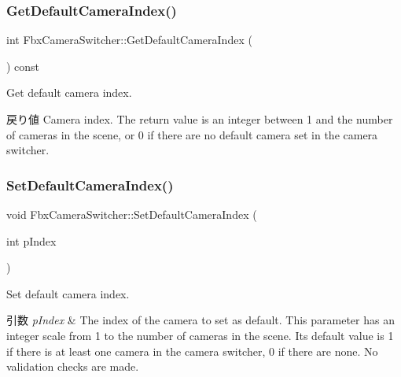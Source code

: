 \mbox{\label{class_fbx_camera_switcher_a283e9644112eee776c029b59ea02f857}} 
\subsubsection{\texorpdfstring{Get\+Default\+Camera\+Index()}{GetDefaultCameraIndex()}}
{\footnotesize\ttfamily int Fbx\+Camera\+Switcher\+::\+Get\+Default\+Camera\+Index (\begin{DoxyParamCaption}{ }\end{DoxyParamCaption}) const}

Get default camera index. \begin{DoxyReturn}{戻り値}
Camera index. The return value is an integer between 1 and the number of cameras in the scene, or 0 if there are no default camera set in the camera switcher. 
\end{DoxyReturn}
\mbox{\label{class_fbx_camera_switcher_a23c4972acf381134aee70436e7d18549}} 
\subsubsection{\texorpdfstring{Set\+Default\+Camera\+Index()}{SetDefaultCameraIndex()}}
{\footnotesize\ttfamily void Fbx\+Camera\+Switcher\+::\+Set\+Default\+Camera\+Index (\begin{DoxyParamCaption}\item[{int}]{p\+Index }\end{DoxyParamCaption})}

Set default camera index. 
\begin{DoxyParams}{引数}
{\em p\+Index} & The index of the camera to set as default. This parameter has an integer scale from 1 to the number of cameras in the scene. Its default value is 1 if there is at least one camera in the camera switcher, 0 if there are none. No validation checks are made. \\
\hline
\end{DoxyParams}


